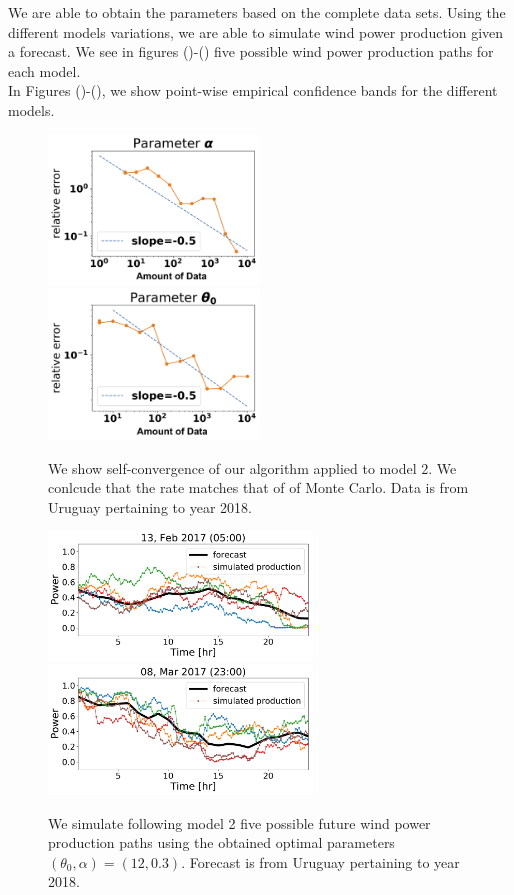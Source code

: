 \documentclass[11pt,english]{article}
\begin{document}
 We are able to obtain the parameters based on the complete data sets. Using the different models variations, we are able to simulate wind power production given a forecast. We see in figures ()-()
five possible wind power production paths for each model.\\

In Figures ()-(), we show point-wise empirical confidence bands for the different models.

\begin{figure}
  \includegraphics[width=56mm,scale=1]{plots/alpha_conv_beta.png}
  \includegraphics[width=56mm,scale=1]{plots/theta_conv_beta.png}
  \caption{We show self-convergence of our algorithm applied to model $2$. We conlcude that the rate  matches that of of Monte Carlo. Data is from Uruguay pertaining to  year 2018. }
\end{figure}

    \begin{figure}[h]
      \includegraphics[width=70mm,scale=1]{simulated/24hr/1099.pdf}
      \includegraphics[width=70mm,scale=1]{simulated/24hr/1178.pdf}
      \caption{We simulate following model 2  five possible future wind power production paths using the obtained optimal parameters $(\theta_0, \alpha )=(12,0.3)$. Forecast is from Uruguay pertaining to  year 2018. }
    \end{figure}
\end{document}
